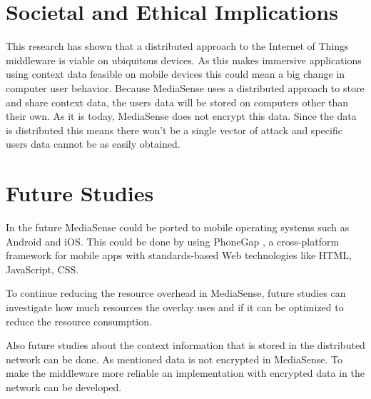 \section{Societal and Ethical Implications}
This research has shown that a distributed approach to the Internet of Things middleware is viable on ubiquitous devices. As this makes immersive applications using context data feasible on mobile devices this could mean a big change in computer user behavior.
Because MediaSense uses a distributed approach to store and share context data, the users data will be stored on computers other than their own. As it is today, MediaSense does not encrypt this data. Since the data is distributed this means there won't be a single vector of attack and specific users data cannot be as easily obtained. 

\section{Future Studies}
In the future MediaSense could be ported to mobile operating systems such as Android and iOS. This could be done by using PhoneGap \cite{phonegap}, a cross-platform framework for mobile apps with standards-based Web technologies like HTML, JavaScript, CSS. 

To continue reducing the resource overhead in MediaSense, future studies can investigate how much resources the overlay uses and if it can be optimized to reduce the resource consumption. 

Also future studies about the context information that is stored in the distributed network can be done. As mentioned data is not encrypted in MediaSense. To make the middleware more reliable an implementation with encrypted data in the network can be developed.